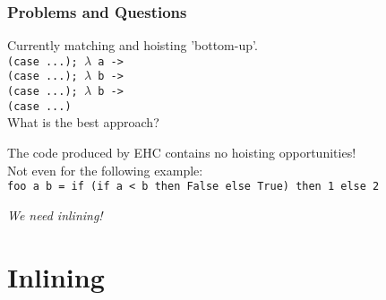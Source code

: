 \documentclass{beamer}
\begin{document}
\begin{frame}[fragile]
\frametitle{Problems and Questions}

Currently matching and hoisting 'bottom-up'. \\
\texttt{(case ...); $\lambda$ a -> \\
(case ...); $\lambda$ b -> \\
(case ...); $\lambda$ b -> \\
(case ...)} \\

What is the best approach? \\

\vspace{0.5cm}

The code produced by EHC contains no hoisting opportunities! \\
Not even for the following example: \\
\texttt{foo a b = if (if a < b then False else True) then 1 else 2} \\

\vspace{0.2cm}

\emph{We need inlining!}

\end{frame}





\section{Inlining}
\end{document}
